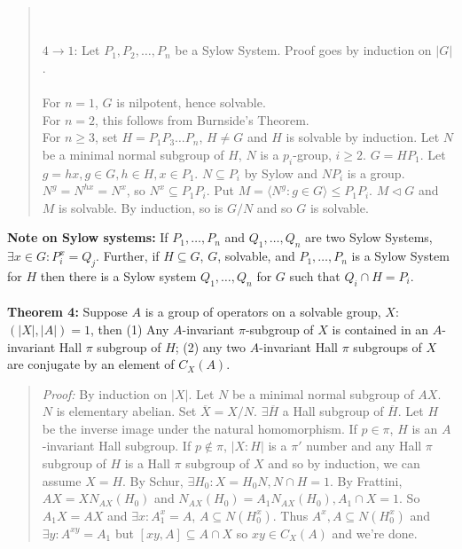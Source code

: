 \begin{quote}
\\
\\
$4 \rightarrow 1$:
Let $P_1, P_2 , \ldots , P_n$ be a Sylow System.  Proof goes by induction on $|G|$.
\\
\\
For $n=1$, $G$ is nilpotent, hence solvable.
\\
For $n=2$, this follows from Burnside's Theorem.
\\
For $n \ge 3$, set $H= P_1 P_3 \ldots P_n$, $H \ne G$ and $H$ is solvable by
induction.  Let $N$ be a minimal normal subgroup of $H$, $N$ is a $p_i$-group,
$i \ge 2$.  $G= H P_1$.  Let $g= hx, g \in G, h \in H, x \in P_1$.
$N \subseteq P_i$ by Sylow and $N P_i$ is a group.  $N^g= N^{hx}= N^x$,
so $N^x \subseteq P_1 P_i$.   Put $M= \langle N^g : g \in G \rangle \le P_1 P_i$.
$M \lhd G$ and $M$ is solvable.  By induction, so is $G/N$ and so $G$ is solvable.
\end{quote}
{\bf Note on Sylow systems:}  If 
$P_1, \ldots, P_n$ and
$Q_1, \ldots, Q_n$ are two Sylow Systems, $\exists x \in G: P_i^x= Q_j$.  Further,
if $H \subseteq G$, $G$, solvable, and
$P_1, \ldots, P_n$ is a Sylow System for $H$ then there is a Sylow system
$Q_1, \ldots, Q_n$ for $G$ such that $Q_i \cap H = P_i$.
\\
\\
{\bf Theorem 4:}
Suppose $A$ is a group of operators on a solvable group, $X$: $(|X|, |A|) = 1$, then
(1) Any $A$-invariant $\pi$-subgroup of $X$ is contained in an $A$-invariant Hall $\pi$ subgroup of $H$; 
(2) any two $A$-invariant Hall $\pi$ subgroups of $X$ are conjugate by an element
of $C_X(A)$.
\begin{quote}
\emph{Proof:}
By induction on $|X|$.
Let $N$ be a minimal normal subgroup of $AX$.  $N$ is elementary abelian.  Set
${\overline X}= X/N$.  $\exists {\overline H}$ a Hall subgroup of ${\overline H}$.
Let $H$ be the inverse image under the natural homomorphism.
If $p \in \pi$, $H$ is an $A$-invariant Hall subgroup.
If $p \notin \pi$, $|X:H|$ is a $\pi'$ number and any Hall $\pi$ subgroup of $H$
is a Hall $\pi$ subgroup of $X$ and so by induction, we can assume $X=H$.
By Schur, $\exists H_0: X= H_0N, N \cap H = 1$.  By Frattini,
$AX= X N_{AX}(H_0)$ and
$N_{AX}(H_0)= A_1 N_{AX}(H_0), A_1 \cap X = 1$.  So $A_1X= AX$ and $\exists x: A_1^x=A$,
$A \subseteq N(H_0^x)$.  Thus $A^x, A \subseteq N(H_0^x)$ and $\exists y: A^{xy}=A_1$
but $[xy, A] \subseteq A \cap X$ so $xy \in C_X(A)$ and we're done.

\end{quote}
